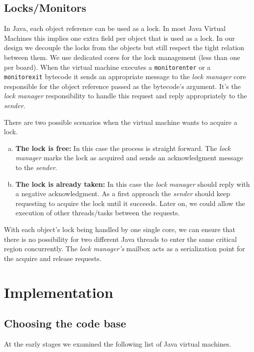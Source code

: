 \documentclass[
a4paper,
12pt,
]{report}
\newcommand{\java}{Java\texttrademark\xspace}
\begin{document}
\section{Locks/Monitors}

In \java, each object reference can be used as a lock. In most \java
Virtual Machines this implies one extra field per object that is used
as a lock. In our design we decouple the locks from the objects but
still respect the tight relation between them. We use dedicated cores
for the lock management (less than one per board). When the virtual
machine executes a \verb!monitorenter! or a \verb!monitorexit!
bytecode it sends an appropriate message to the \emph{lock manager}
core responsible for the object reference passed as the bytecode's
argument. It's the \emph{lock manager} responsibility to handle this
request and reply appropriately to the \emph{sender}.

There are two possible scenarios when the virtual machine wants to
acquire a lock.
\begin{enumerate}[a)]
\item \textbf{The lock is free:} In this case the process is straight
  forward.  The \emph{lock manager} marks the lock as acquired and
  sends an acknowledgment message to the \emph{sender}.
\item \textbf{The lock is already taken:} In this case the \emph{lock
    manager} should reply with a negative acknowledgment. As a first
  approach the \emph{sender} should keep requesting to acquire the
  lock until it succeeds. Later on, we could allow the execution of
  other threads/tasks between the requests.
\end{enumerate}

With each object's lock being handled by one single core, we can
ensure that there is no possibility for two different \java threads to
enter the same critical region concurrently. The \emph{lock manager's}
mailbox acts as a serialization point for the acquire and release
requests.

\chapter{Implementation}
\label{cha:implementation}

\section{Choosing the code base}

At the early stages we examined the following list of \java virtual
machines.
\end{document}

